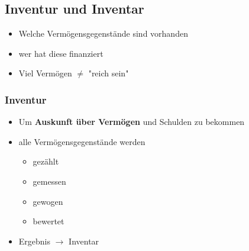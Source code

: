 \documentclass[a4paper, ngerman]{article}
\begin{document}
\subsection{Inventur und Inventar}
\begin{itemize}
    \item Welche Vermögensgegenstände sind vorhanden
    \item wer hat diese finanziert
    \item Viel Vermögen $\neq$ "reich sein"
\end{itemize}
\subsubsection{Inventur}
\begin{itemize}
    \item Um \textbf{Auskunft über Vermögen} und Schulden zu bekommen
    \item alle Vermögensgegenstände werden
          \begin{itemize}
              \item gezählt
              \item gemessen
              \item gewogen
              \item bewertet
          \end{itemize}
    \item Ergebnis $\rightarrow$ Inventar
\end{itemize}
\end{document}
